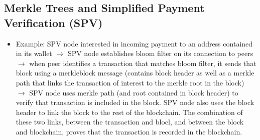 \documentclass[english, 11pt]{article}
\begin{document}
\subsection{Merkle Trees and Simplified Payment Verification (SPV)}
\begin{itemize}
    \item Example: SPV node interested in incoming payment to an address contained in its wallet $\rightarrow$ SPV node establishes bloom filter on its connection to peers $\rightarrow$ when peer identifies a transaction that matches bloom filter, it sends that block using a merkleblock message (contains block header as well as a merkle path that links the transaction of interest to the merkle root in the block) $\rightarrow$ SPV node uses merkle path (and root contained in block header) to verify that transaction is included in the block. SPV node also uses the block header to link the block to the rest of the blockchain. The combination of these two links, between the transaction and blocl, and between the block and blockchain, proves that the transaction is recorded in the blockchain.
\end{itemize}
\end{document}
